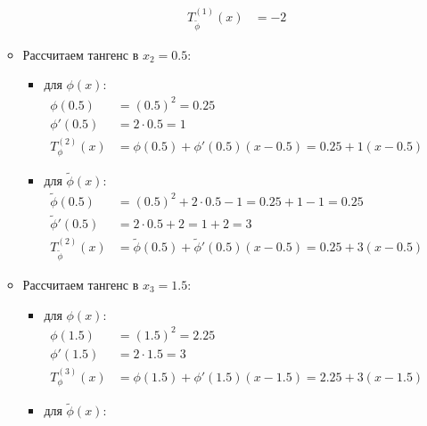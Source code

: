 \documentclass[12pt]{scrartcl}
\begin{document}
\begin{enumerate}
\begin{itemize}
\begin{itemize}
\begin{align*}
                T_{\tilde{\phi}}^{(1)}(x) &= -2
            \end{align*}
        \end{itemize}
        \item Рассчитаем тангенс в $x_{2} = 0.5$:
        \begin{itemize}
            \item для $\phi(x)$:
            \begin{align*}
                \phi(0.5) &= (0.5)^2 = 0.25 \\
                \phi'(0.5) &= 2 \cdot 0.5 = 1 \\
                T_{\phi}^{(2)}(x) &= \phi(0.5) + \phi'(0.5)(x - 0.5) = 0.25 + 1(x - 0.5)
            \end{align*}
            \item для $\tilde{\phi}(x)$:
            \begin{align*}
                \tilde{\phi}(0.5) &= (0.5)^2 + 2 \cdot 0.5 - 1 = 0.25 + 1 - 1 = 0.25 \\
                \tilde{\phi}'(0.5) &= 2 \cdot 0.5 + 2 = 1 + 2 = 3 \\
                T_{\tilde{\phi}}^{(2)}(x) &= \tilde{\phi}(0.5) + \tilde{\phi}'(0.5)(x - 0.5) = 0.25 + 3(x - 0.5)
            \end{align*}
        \end{itemize}
        \item Рассчитаем тангенс в $x_{3} = 1.5$:
        \begin{itemize}
            \item для $\phi(x)$:
            \begin{align*}
                \phi(1.5) &= (1.5)^2 = 2.25 \\
                \phi'(1.5) &= 2 \cdot 1.5 = 3 \\
                T_{\phi}^{(3)}(x) &= \phi(1.5) + \phi'(1.5)(x - 1.5) = 2.25 + 3(x - 1.5)
            \end{align*}
            \item для $\tilde{\phi}(x)$:
            \begin{align*}

\end{align*}
\end{itemize}
\end{itemize}
\end{enumerate}
\end{document}
